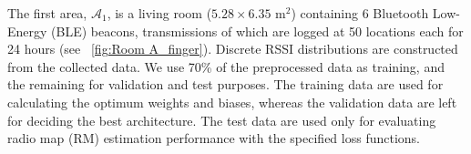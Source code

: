 \documentclass{article}
\newcommand{\x}{\mathbf{x}}
\newcommand{\bea}{\mathbf{b}}
\begin{document}
	The first area, $\mathcal{A}_1$, is a living room ($5.28\times6.35$ m$^2$) containing 6 Bluetooth Low-Energy (BLE) beacons, transmissions of which are logged at 50 locations each for 24 hours \cite{Ser2017} (see \figurename~\ref{fig:Room A_finger}). Discrete RSSI distributions are constructed from the collected data. We use 70\% of the preprocessed data as training, and the remaining for validation and test purposes. The training data are used for calculating the optimum weights and biases, whereas the validation data are left for deciding the best architecture. The test data are used only for evaluating radio map (RM) estimation performance with the specified loss functions. 
\end{document}
